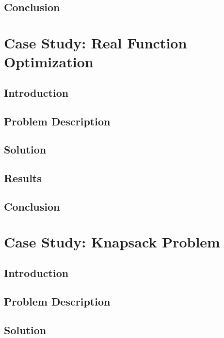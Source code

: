   \section{Conclusion}
  \label{sec:conclusion}
    \Blindtext

\chapter{Case Study: Real Function Optimization}
\label{chap:case_study_real_function_optimization}
  \section{Introduction}
  \label{sec:introduction}
    \Blindtext
  \section{Problem Description}
  \label{sec:problem_description}
    \Blindtext
  \section{Solution}
  \label{sec:solution}
    \Blindtext
  \section{Results}
  \label{sec:results}
    \Blindtext
  \section{Conclusion}
  \label{sec:conclusion}
    \Blindtext

\chapter{Case Study: Knapsack Problem}
\label{chap:case_study_knapsack}
  \section{Introduction}
  \label{sec:introduction}
    \Blindtext
  \section{Problem Description}
  \label{sec:problem_description}
    \Blindtext
  \section{Solution}
  \label{sec:solution}
    \Blindtext
